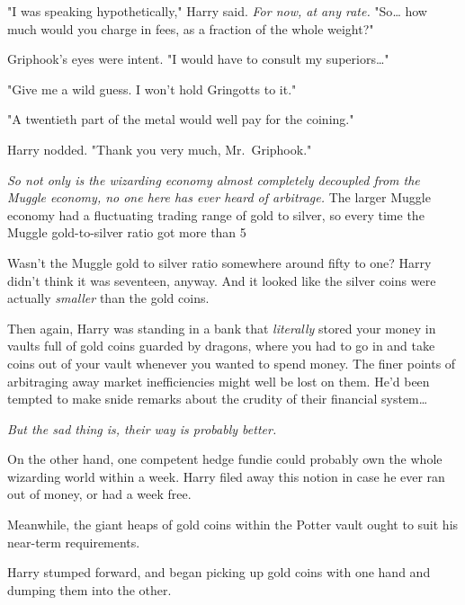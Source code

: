 "I was speaking hypothetically," Harry said. \emph{For now, at any rate.} "So{\ldots} how much would you charge in fees, as a fraction of the whole weight?"

Griphook's eyes were intent. "I would have to consult my superiors{\ldots}"

"Give me a wild guess. I won't hold Gringotts to it."

"A twentieth part of the metal would well pay for the coining."

Harry nodded. "Thank you very much, Mr.~Griphook."

\emph{So not only is the wizarding economy almost completely decoupled from the Muggle economy, no one here has ever heard of arbitrage.} The larger Muggle economy had a fluctuating trading range of gold to silver, so every time the Muggle gold-to-silver ratio got more than 5%

Wasn't the Muggle gold to silver ratio somewhere around fifty to one? Harry didn't think it was seventeen, anyway. And it looked like the silver coins were actually \emph{smaller} than the gold coins.

Then again, Harry was standing in a bank that \emph{literally} stored your money in vaults full of gold coins guarded by dragons, where you had to go in and take coins out of your vault whenever you wanted to spend money. The finer points of arbitraging away market inefficiencies might well be lost on them. He'd been tempted to make snide remarks about the crudity of their financial system{\ldots}

\emph{But the sad thing is, their way is probably better.}

On the other hand, one competent hedge fundie could probably own the whole wizarding world within a week. Harry filed away this notion in case he ever ran out of money, or had a week free.

Meanwhile, the giant heaps of gold coins within the Potter vault ought to suit his near-term requirements.

Harry stumped forward, and began picking up gold coins with one hand and dumping them into the other.

